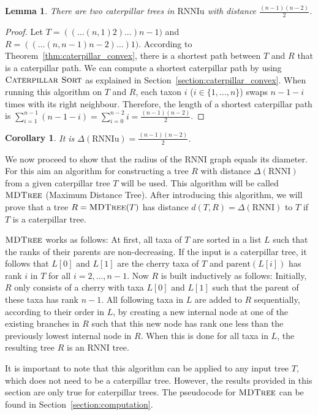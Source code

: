 \documentclass{amsart}
\newcommand{\parent}{\mathrm{parent}}
\newcommand{\rnni}{\mathrm{RNNI}}
\newcommand{\rnniu}{\mathrm{RNNIu}}
\newcommand{\csort}{\textsc{Caterpillar Sort}}
\newcommand{\mdtree}{\textsc{MDTree}}
\newtheorem{lemma}[definition]{Lemma}
\newtheorem{corollary}[definition]{Corollary}
\begin{document}
\begin{lemma}
	There are two caterpillar trees in $\rnniu$ with distance $\frac{(n-1)(n-2)}{2}$.
	\label{lemma:caterpillar_diameter}
\end{lemma}

\begin{proof}
	Let $T = (( \dots (n,1)2)\dots)n-1)$ and $R = (( \dots (n,n-1)n-2)\dots)1)$.
    According to Theorem~\ref{thm:caterpillar_convex}, there is a shortest path between $T$ and $R$ that is a caterpillar path.
    We can compute a shortest caterpillar path by using $\csort$ as explained in Section~\ref{section:caterpillar_convex}.
    When running this algorithm on $T$ and $R$, each taxon $i$ ($i \in \{1, \ldots, n\}$) swaps $n-1-i$ times with its right neighbour.
    Therefore, the length of a shortest caterpillar path is $\sum\limits_{i=1}^{n-1}(n-1-i) = \sum\limits_{i=0}^{n-2}i = \frac{(n-1)(n-2)}{2}$.
\end{proof}

\begin{corollary}
    It is $\Delta(\rnniu) = \frac{(n-1)(n-2)}{2}$.
    \label{corollary:diameter}
\end{corollary}

We now proceed to show that the radius of the $\rnni$ graph equals its diameter.
For this aim an algorithm for constructing a tree $R$ with distance $\Delta(\rnni)$ from a given caterpillar tree $T$ will be used.
This algorithm will be called $\mdtree$ (Maximum Distance Tree).
After introducing this algorithm, we will prove that a tree $R = \mdtree(T)$ has distance $d(T,R) = \Delta(\rnni)$ to $T$ if $T$ is a caterpillar tree.

$\mdtree$ works as follows:
At first, all taxa of $T$ are sorted in a list $L$ such that the ranks of their parents are non-decreasing.
If the input is a caterpillar tree, it follows that $L[0]$ and $L[1]$ are the cherry taxa of $T$ and $\parent(L[i])$ has rank $i$ in $T$ for all $i = 2, \ldots, n-1$.
Now $R$ is built inductively as follows:
Initially, $R$ only consists of a cherry with taxa $L[0]$ and $L[1]$ such that the parent of these taxa has rank $n-1$.
All following taxa in $L$ are added to $R$ sequentially, according to their order in $L$, by creating a new internal node at one of the existing branches in $R$ such that this new node has rank one less than the previously lowest internal node in $R$.
When this is done for all taxa in $L$, the resulting tree $R$ is an $\rnni$ tree.

It is important to note that this algorithm can be applied to any input tree $T$, which does not need to be a caterpillar tree.
However, the results provided in this section are only true for caterpillar trees.
The pseudocode for $\mdtree$ can be found in Section~\ref{section:computation}.
\end{document}
